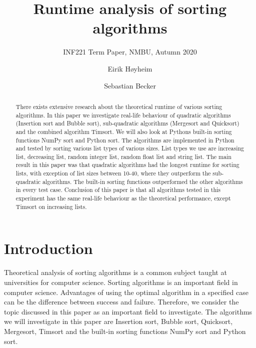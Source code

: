 \documentclass[sigconf, nonacm, natbib, screen, balance=False]{acmart}
\begin{document}
\title{Runtime analysis of sorting algorithms}
\subtitle{INF221 Term Paper, NMBU, Autumn 2020}

\author{Eirik Høyheim}
\affiliation{}  %

\author{Sebastian Becker}

\begin{abstract}
There exists extensive research about the theoretical runtime of various sorting algorithms. In this paper we investigate real-life behaviour of quadratic algorithms (Insertion sort and Bubble sort), sub-quadratic algorithms (Mergesort and Quicksort) and the combined algorithm Timsort. We will also look at Pythons built-in sorting functions NumPy sort and Python sort. The algorithms are implemented in Python and tested by sorting various list types of various sizes. List types we use are increasing list, decreasing list, random integer list, random float list and string list. The main result in this paper was that quadratic algorithms had the longest runtime for sorting lists, with exception of list sizes between 10-40, where they outperform the sub-quadratic algorithms. The built-in sorting functions outperformed the other algorithms in every test case. Conclusion of this paper is that all algorithms tested in this experiment has the same real-life behaviour as the theoretical performance, except Timsort on increasing lists.  

\end{abstract}


\maketitle

\section{Introduction}\label{sec:intro}

Theoretical analysis of sorting algorithms is a common subject taught at universities for computer science. Sorting algorithms is an important field in computer science. Advantages of using the optimal algorithm in a specified case can be the difference between success and failure. Therefore, we consider the topic discussed in this paper as an important field to investigate. The algorithms we will investigate in this paper are Insertion sort, Bubble sort, Quicksort, Mergesort, Timsort and the built-in sorting functions NumPy sort and Python sort. 
\end{document}
